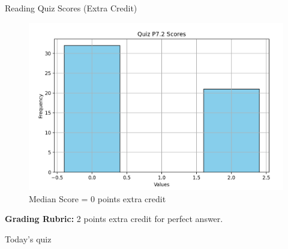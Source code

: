 \documentclass[10pt]{beamer}
\begin{document}
\begin{frame}{Reading Quiz Scores (Extra Credit)}
\begin{figure}[ht]
        \centering
        \includegraphics[width=.7\textwidth]{images/reading_quiz_scores}
   		 \caption{Median Score = 0 points extra credit}
\end{figure}
\vfill 
\textbf{Grading Rubric:}  2 points extra credit for perfect answer.
\end{frame}	


%
%
%
%


\begin{frame}[standout]
Today's quiz
\end{frame}
\end{document}
